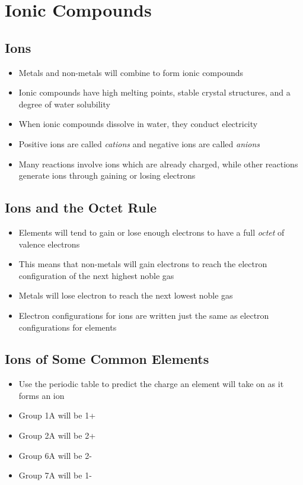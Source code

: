 \documentclass[12pt, openany, letterpaper]{memoir}
\begin{document}
\chapter{Ionic Compounds}
\section{Ions}
\begin{itemize}
	\item Metals and non-metals will combine to form ionic compounds
	\item Ionic compounds have high melting points, stable crystal structures, and a degree of water solubility
	\item When ionic compounds dissolve in water, they conduct electricity
	\item Positive ions are called \emph{cations} and negative ions are called \emph{anions}
	\item Many reactions involve ions which are already charged, while other reactions generate ions through gaining or losing electrons
\end{itemize}

\section{Ions and the Octet Rule}
\begin{itemize}
	\item Elements will tend to gain or lose enough electrons to have a full \emph{octet} of valence electrons
	\item This means that non-metals will gain electrons to reach the electron configuration of the next highest noble gas
	\item Metals will lose electron to reach the next lowest noble gas
	\item Electron configurations for ions are written just the same as electron configurations for elements
\end{itemize}

\section{Ions of Some Common Elements}
\begin{itemize}
	\item Use the periodic table to predict the charge an element will take on as it forms an ion
	\item Group 1A will be 1+
	\item Group 2A will be 2+
	\item Group 6A will be 2-
	\item Group 7A will be 1-
\end{itemize}
\end{document}
